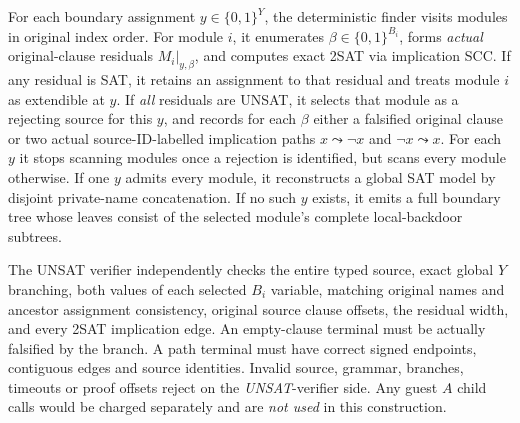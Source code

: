 \documentclass[11pt]{article}
\begin{document}
For each boundary assignment $y\in\{0,1\}^Y$, the deterministic finder visits modules in original index order. For module $i$, it enumerates $\beta\in\{0,1\}^{B_i}$, forms \emph{actual} original-clause residuals $M_i|_{y,\beta}$, and computes exact 2SAT via implication SCC. If any residual is SAT, it retains an assignment to that residual and treats module $i$ as extendible at $y$. If \emph{all} residuals are UNSAT, it selects that module as a rejecting source for this $y$, and records for each $\beta$ either a falsified original clause or two actual source-ID-labelled implication paths $x\leadsto\neg x$ and $\neg x\leadsto x$. For each $y$ it stops scanning modules once a rejection is identified, but scans every module otherwise. If one $y$ admits every module, it reconstructs a global SAT model by disjoint private-name concatenation. If no such $y$ exists, it emits a full boundary tree whose leaves consist of the selected module's complete local-backdoor subtrees.

The UNSAT verifier independently checks the entire typed source, exact global $Y$ branching, both values of each selected $B_i$ variable, matching original names and ancestor assignment consistency, original source clause offsets, the residual width, and every 2SAT implication edge. An empty-clause terminal must be actually falsified by the branch. A path terminal must have correct signed endpoints, contiguous edges and source identities. Invalid source, grammar, branches, timeouts or proof offsets reject on the \emph{UNSAT}-verifier side. Any guest $A$ child calls would be charged separately and are \emph{not used} in this construction.
\end{document}

